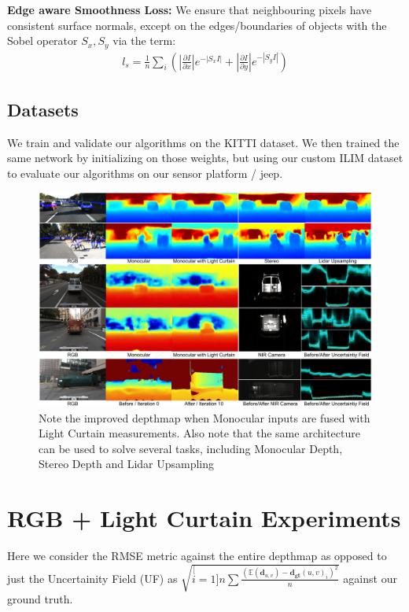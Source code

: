 \textbf{Edge aware Smoothness Loss:} We ensure that neighbouring pixels have consistent surface normals, except on the edges/boundaries of objects with the Sobel operator $S_{x}, S_{y}$ via the term:
\small
\begin{align}
    l_{s}=\frac{1}{n}\sum_{i}\left(\left|\frac{\partial I}{\partial x}\right|e^{-|S_{x}I|}+\left|\frac{\partial I}{\partial y}\right|e^{-|S_{y}I|}\right)
   \label{eq:smooth} 
\end{align}
\normalsize

\subsection{Datasets}

We train and validate our algorithms on the KITTI dataset. We then trained the same network by initializing on those weights, but using our custom ILIM dataset to evaluate our algorithms on our sensor platform / jeep.

\begin{figure}[h!]
   \includegraphics[width=1.0\textwidth]{figures/images.pdf}
   \caption{Note the improved depthmap when Monocular inputs are fused with Light Curtain measurements. Also note that the same architecture can be used to solve several tasks, including Monocular Depth, Stereo Depth and Lidar Upsampling}  
   \label{fig:images2} 
\end{figure}

\section{RGB + Light Curtain Experiments} 

Here we consider the RMSE metric against the entire depthmap as opposed to just the Uncertainity Field (UF) as $\sqrt{\stackrel[i=1]{n}{\sum}\frac{\left(\mathbb{E}\left(\mathbf{d}_{u,v}\right)-\mathbf{d_{gt}}(u,v)_{i}\right)^{2}}{n}}$ against our ground truth.

